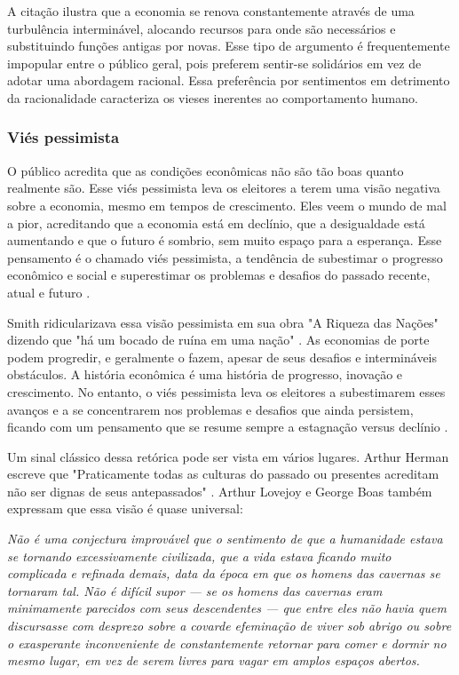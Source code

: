 A citação ilustra que a economia se renova constantemente através de uma turbulência interminável, alocando recursos para onde são necessários e substituindo funções antigas por novas. Esse tipo de argumento é frequentemente impopular entre o público geral, pois preferem sentir-se solidários em vez de adotar uma abordagem racional. Essa preferência por sentimentos em detrimento da racionalidade caracteriza os vieses inerentes ao comportamento humano.

\subsubsection{Viés pessimista}

O público acredita que as condições econômicas não são tão boas quanto realmente são. Esse viés pessimista leva os eleitores a terem uma visão negativa sobre a economia, mesmo em tempos de crescimento. Eles veem o mundo de mal a pior, acreditando que a economia está em declínio, que a desigualdade está aumentando e que o futuro é sombrio, sem muito espaço para a esperança. Esse pensamento é o chamado viés pessimista, a tendência de subestimar o progresso econômico e social e superestimar os problemas e desafios do passado recente, atual e futuro \cite{The_Myth_of_the_Rational_Voter}.

Smith ridicularizava essa visão pessimista em sua obra "A Riqueza das Nações" dizendo que "há um bocado de ruína em uma nação" \cite{smith1776inquiry}. As economias de porte podem progredir, e geralmente o fazem, apesar de seus desafios e intermináveis obstáculos. A história econômica é uma história de progresso, inovação e crescimento. No entanto, o viés pessimista leva os eleitores a subestimarem esses avanços e a se concentrarem nos problemas e desafios que ainda persistem, ficando com um pensamento que se resume sempre a estagnação versus declínio \cite{The_Myth_of_the_Rational_Voter}.

Um sinal clássico dessa retórica pode ser vista em vários lugares. Arthur Herman escreve que "Praticamente todas as culturas do passado ou presentes acreditam não ser dignas de seus antepassados" \cite{herman1997idea}. Arthur Lovejoy e George Boas também expressam que essa visão é quase universal:

\begin{citacao}
    \textit{
        Não é uma conjectura improvável que o sentimento de que a humanidade estava se tornando excessivamente civilizada, que a vida estava ficando muito complicada e refinada demais, data da época em que os homens das cavernas se tornaram tal. Não é difícil supor — se os homens das cavernas eram minimamente parecidos com seus descendentes — que entre eles não havia quem discursasse com desprezo sobre a covarde efeminação de viver sob abrigo ou sobre o exasperante inconveniente de constantemente retornar para comer e dormir no mesmo lugar, em vez de serem livres para vagar em amplos espaços abertos.
    } \newline
    \cite{lovejoy_boas_1965}
\end{citacao}

